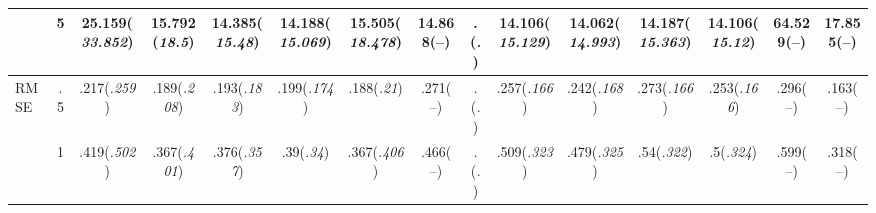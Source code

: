\documentclass{article}
\begin{document}
\begin{table}[tbp]
{\begin{tabularx}{\textwidth}{lCCCCCCCCCCCCCC}
&5&25.159\newline (\emph{33.852})&15.792\newline (\emph{18.5})&14.385\newline (\emph{15.48})&14.188\newline (\emph{15.069})&15.505\newline (\emph{18.478})&14.868\newline (--)&.\newline (\emph{.})&14.106\newline (\emph{15.129})&14.062\newline (\emph{14.993})&14.187\newline (\emph{15.363})&14.106\newline (\emph{15.12})&64.529\newline (--)&17.855\newline (--) \tabularnewline
\midrule RMSE&.5&.217\newline (\emph{.259})&.189\newline (\emph{.208})&.193\newline (\emph{.183})&.199\newline (\emph{.174})&.188\newline (\emph{.21})&.271\newline (--)&.\newline (\emph{.})&.257\newline (\emph{.166})&.242\newline (\emph{.168})&.273\newline (\emph{.166})&.253\newline (\emph{.166})&.296\newline (--)&.163\newline (--) \tabularnewline
&1&.419\newline (\emph{.502})&.367\newline (\emph{.401})&.376\newline (\emph{.357})&.39\newline (\emph{.34})&.367\newline (\emph{.406})&.466\newline (--)&.\newline (\emph{.})&.509\newline (\emph{.323})&.479\newline (\emph{.325})&.54\newline (\emph{.322})&.5\newline (\emph{.324})&.599\newline (--)&.318\newline (--) \tabularnewline

\end{tabularx}}
\end{table}
\end{document}

